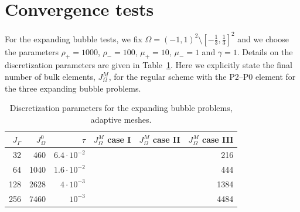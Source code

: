 \section{Convergence tests}\label{sec:ns_convergence_results}
For the expanding bubble tests, we fix $\Omega = (-1,1)^2 \setminus
[-\frac13,\frac13]^2$ and we choose the parameters $\rho_+ = 1000$, $\rho_- =
100$, $\mu_+ = 10$, $\mu_- = 1$ and $\gamma = 1$. Details on the discretization
parameters are given in Table~\ref{tab:nsexpandingbubbleelements}. Here we
explicitly state the final number of bulk elements, $J_\Omega^M$, for the
regular scheme with the P2--P0 element for the three expanding bubble problems.
\begin{table}
\center
\begin{tabular}{rrrrrr}
\hline
$J_\Gamma$ & $J_\Omega^0$ & $\tau$ & $J_\Omega^M$ case I & $J_\Omega^M$ case II
& $J_\Omega^M$ case III \\
\hline
 32 &  460 & $6.4\cdot10^{-2}$ & & &  216 \\
 64 & 1040 & $1.6\cdot10^{-2}$ & & &  444 \\
128 & 2628 &   $4\cdot10^{-3}$ & & & 1384 \\
256 & 7460 &         $10^{-3}$ & & & 4484 \\
\hline
\end{tabular}
\caption[Navier--Stokes expanding bubble meshes parameters]
{Discretization parameters for the expanding bubble problems, adaptive meshes.}
\label{tab:nsexpandingbubbleelements}
\end{table}

